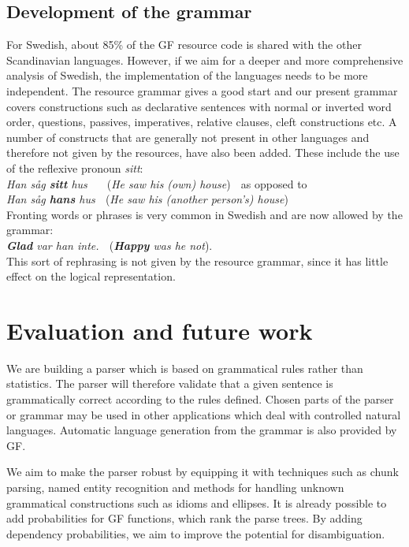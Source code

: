 \documentclass[submission]{eptcs} %
\begin{document}
\subsection{Development of the grammar}
For Swedish, about 85\% of the GF resource code is shared with the other Scandinavian
languages. 
However, if we aim for a deeper and more comprehensive analysis of Swedish,
the implementation of the languages needs to be more independent.
The resource grammar gives a good start and our present grammar 
covers constructions such as declarative sentences with normal or inverted
word order, questions, passives, imperatives, relative clauses, cleft
constructions etc.
A number of constructs that are generally not present in other languages and
therefore not given by the resources, have also been added. These include the use of
the reflexive pronoun \emph{sitt}: \\
\emph{Han såg \textbf{sitt} hus} $\; \; \; \;$ (\emph{He saw his (own) house}) $\;$
as opposed to \\
\emph{Han såg \textbf{hans} hus} $\;$ (\emph{He saw his (another person's) house}) \\
Fronting words or phrases is very common in Swedish and are now allowed by the grammar:\\
\emph{\textbf{Glad} var han inte.} $\;$ (\emph{\textbf{Happy} was he not}). \\
This sort of rephrasing is not given by the resource grammar, since it
has little effect on the logical representation.

\section{Evaluation and future work}
We are building a parser which is based on grammatical rules rather than
statistics. The parser will therefore validate that
a given sentence is grammatically correct according to the rules defined.
Chosen parts of the parser or grammar may be used in other applications
which deal with controlled natural languages. Automatic language
generation from the grammar is also provided by GF.

We aim to make the parser robust by equipping it with techniques such as chunk
parsing, named entity recognition and methods for handling unknown 
grammatical constructions such as idioms and ellipses. 
It is already possible to add probabilities for GF functions,
which rank the parse trees.
By adding dependency probabilities, we aim to improve the
potential for disambiguation.
\end{document}
